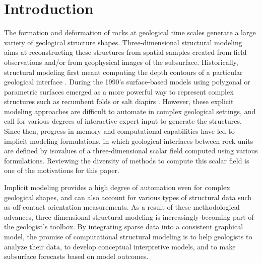 \documentclass[preprint]{ring20}
\begin{document}
\section*{Introduction}


The formation and deformation of rocks at geological time scales generate a large variety of geological structure shapes. Three-dimensional structural modeling aims at reconstructing these structures from spatial samples created from field observations and/or from geophysical images of the subsurface. Historically, structural modeling first meant computing the depth contours of a particular geological interface \citep[e.g.,][]{Walters1969AB,Hardy1971JGR,Briggs1974G,Bolondi1976G}. During the 1990's surface-based models using polygonal or parametric surfaces emerged as a more powerful way to represent complex structures such as recumbent folds or salt diapirs \citep{Mallet1992CD,deKemp1999CG}. However, these explicit modeling approaches are difficult to automate in complex geological settings, and call for various degrees of interactive expert input to generate the structures. Since then, progress in memory and computational capabilities have led to implicit modeling formulations, in which geological interfaces between rock units are defined by isovalues of a three-dimensional scalar field computed using various formulations\citep[][]{Lajaunie1997MG,Cowan2002ASGMEM,Calcagno2008PEPI,Frank2007CG,Caumon2013GaRSITo,Souche20137ECEISE2,Hillier2014MG,Laurent2016MG,Laurent2016EaPSL,Martin2017CG,Grose2017JSG,delaVarga2018GMDD,Grose2019JoSG,Renaudeau2019BEMRMX,Renaudeau2019MG,Manchuk2019CG,Grose2021GMDa,Irakarama2021MG,Hillier2021MG,Goncalves2021C&G,Irakarama2022CD,Pizzella2022MG,Bi2022GMD}. Reviewing the diversity of methods to compute this scalar field is one of the motivations for this paper.  

Implicit modeling provides a high degree of automation even for complex geological shapes, and can also account for various types of structural data such as off-contact orientation  measurements. As a result of these methodological advances, three-dimensional structural modeling is increasingly becoming part of the geologist's toolbox. By integrating sparse data into a consistent graphical model, the promise of computational structural modeling is to help geologists to analyze their data, to develop conceptual interpretive models, and to make subsurface forecasts based on model outcomes. 
\end{document}
